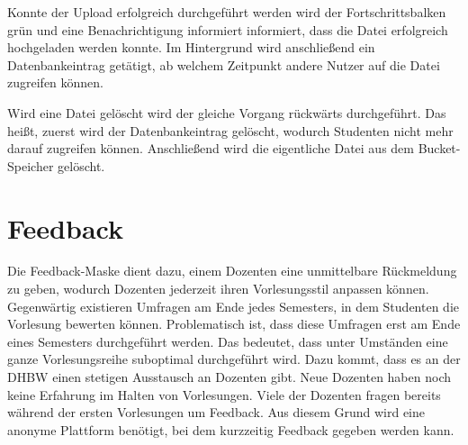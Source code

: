 Konnte der Upload erfolgreich durchgeführt werden wird der Fortschrittsbalken grün und eine Benachrichtigung informiert informiert, dass die Datei erfolgreich hochgeladen werden konnte.
Im Hintergrund wird anschließend ein Datenbankeintrag getätigt, ab welchem Zeitpunkt andere Nutzer auf die Datei zugreifen können.

Wird eine Datei gelöscht wird der gleiche Vorgang rückwärts durchgeführt.
Das heißt, zuerst wird der Datenbankeintrag gelöscht, wodurch Studenten nicht mehr darauf zugreifen können.
Anschließend wird die eigentliche Datei aus dem Bucket-Speicher gelöscht.











\section{Feedback}
Die Feedback-Maske dient dazu, einem Dozenten eine unmittelbare Rückmeldung zu geben, wodurch Dozenten jederzeit ihren Vorlesungsstil anpassen können.
Gegenwärtig existieren Umfragen am Ende jedes Semesters, in dem Studenten die Vorlesung bewerten können.
Problematisch ist, dass diese Umfragen erst am Ende eines Semesters durchgeführt werden.
Das bedeutet, dass unter Umständen eine ganze Vorlesungsreihe suboptimal durchgeführt wird.
Dazu kommt, dass es an der DHBW einen stetigen Ausstausch an Dozenten gibt.
Neue Dozenten haben noch keine Erfahrung im Halten von Vorlesungen.
Viele der Dozenten fragen bereits während der ersten Vorlesungen um Feedback.
Aus diesem Grund wird eine anonyme Plattform benötigt, bei dem kurzzeitig Feedback gegeben werden kann.








